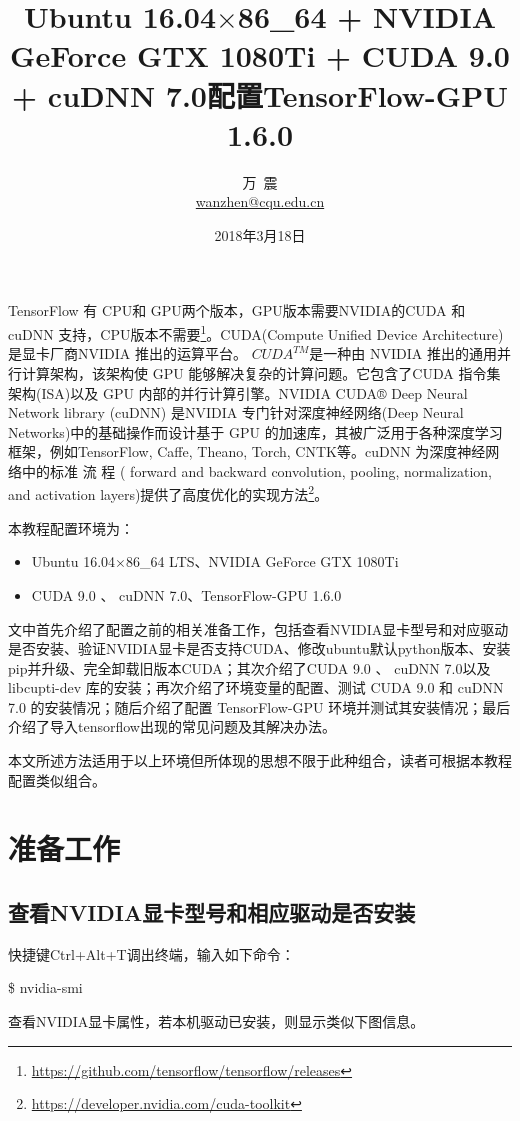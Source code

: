 \documentclass[11pt,a4paper]{ctexart}
\begin{document}
\title{Ubuntu 16.04$ \times$86\_64 + NVIDIA GeForce GTX 1080Ti +  CUDA 9.0 + cuDNN 7.0配置TensorFlow-GPU 1.6.0 }  
\author{\kaishu\Large 万\ 震\\ \href{mailto:wanzhen@cqu.edu.cn}{wanzhen@cqu.edu.cn}}
\date{2018年3月18日}
\maketitle

TensorFlow 有 CPU和 GPU两个版本，GPU版本需要NVIDIA的CUDA 和 cuDNN 支持，CPU版本不需要\footnote{\url{https://github.com/tensorflow/tensorflow/releases}}。CUDA(Compute Unified Device Architecture)是显卡厂商NVIDIA 推出的运算平台。 $CUDA^{TM}$是一种由 NVIDIA 推出的通用并行计算架构，该架构使 GPU 能够解决复杂的计算问题。它包含了CUDA 指令集架构(ISA)以及 GPU 内部的并行计算引擎。NVIDIA CUDA® Deep Neural Network library (cuDNN) 是NVIDIA 专门针对深度神经网络(Deep Neural Networks)中的基础操作而设计基于 GPU 的加速库，其被广泛用于各种深度学习框架，例如TensorFlow, Caffe, Theano, Torch, CNTK等。cuDNN 为深度神经网络中的标准 流 程 ( forward and backward convolution, pooling, normalization, and activation layers)提供了高度优化的实现方法\footnote{\url{https://developer.nvidia.com/cuda-toolkit}}。

本教程配置环境为：
\vspace{-0.3cm}
\begin{itemize}
\item Ubuntu 16.04$ \times$86\_64  LTS、NVIDIA GeForce GTX 1080Ti 
\item CUDA 9.0 、 cuDNN 7.0、TensorFlow-GPU 1.6.0
\end{itemize}
文中首先介绍了配置之前的相关准备工作，包括查看NVIDIA显卡型号和对应驱动是否安装、验证NVIDIA显卡是否支持CUDA、修改ubuntu默认python版本、安装pip并升级、完全卸载旧版本CUDA；其次介绍了CUDA 9.0 、 cuDNN 7.0以及libcupti-dev 库的安装；再次介绍了环境变量的配置、测试 CUDA 9.0 和 cuDNN 7.0 的安装情况；随后介绍了配置 TensorFlow-GPU 环境并测试其安装情况；最后介绍了导入tensorflow出现的常见问题及其解决办法。

本文所述方法适用于以上环境但所体现的思想不限于此种组合，读者可根据本教程配置类似组合。

\section{准备工作}
\subsection{查看NVIDIA显卡型号和相应驱动是否安装}
快捷键Ctrl+Alt+T调出终端，输入如下命令：
\begin{center}
\$ nvidia-smi
\end{center}
查看NVIDIA显卡属性，若本机驱动已安装，则显示类似下图信息。
\end{document}
